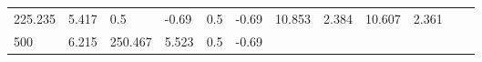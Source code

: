 \documentclass{article}
\begin{document}
\begin{longtable}[]{@{}llllllllllll@{}}
\begin{minipage}[t]{0.06\columnwidth}
225.235\strut
\end{minipage} & \begin{minipage}[t]{0.08\columnwidth}\raggedright\strut
5.417\strut
\end{minipage} & \begin{minipage}[t]{0.03\columnwidth}\raggedright\strut
0.5\strut
\end{minipage} & \begin{minipage}[t]{0.06\columnwidth}\raggedright\strut
-0.69\strut
\end{minipage} & \begin{minipage}[t]{0.03\columnwidth}\raggedright\strut
0.5\strut
\end{minipage} & \begin{minipage}[t]{0.06\columnwidth}\raggedright\strut
-0.69\strut
\end{minipage} & \begin{minipage}[t]{0.06\columnwidth}\raggedright\strut
10.853\strut
\end{minipage} & \begin{minipage}[t]{0.08\columnwidth}\raggedright\strut
2.384\strut
\end{minipage} & \begin{minipage}[t]{0.06\columnwidth}\raggedright\strut
10.607\strut
\end{minipage} & \begin{minipage}[t]{0.09\columnwidth}\raggedright\strut
2.361\strut
\end{minipage}\tabularnewline
\begin{minipage}[t]{0.03\columnwidth}\raggedright\strut
500\strut
\end{minipage} & \begin{minipage}[t]{0.06\columnwidth}\raggedright\strut
6.215\strut
\end{minipage} & \begin{minipage}[t]{0.06\columnwidth}\raggedright\strut
250.467\strut
\end{minipage} & \begin{minipage}[t]{0.08\columnwidth}\raggedright\strut
5.523\strut
\end{minipage} & \begin{minipage}[t]{0.03\columnwidth}\raggedright\strut
0.5\strut
\end{minipage} & \begin{minipage}[t]{0.06\columnwidth}\raggedright\strut
-0.69\strut
\end{minipage} & \begin{minipage}[t]{0.03\columnwidth}\raggedright\strut

\end{minipage}
\end{longtable}
\end{document}
